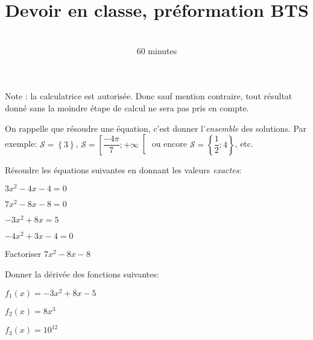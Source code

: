 \documentclass[a4paper,12pt]{scrartcl}
\date{}
\title{Devoir en classe, préformation BTS}
\author{\rotatebox{180}{\textsc{Mathématiques}} \\ 60 minutes}
\begin{document}
\newcommand{\fewlines}{3}
\newcommand{\midlines}{4}
\newcommand{\manylines}{6}

\maketitle


Note : la calculatrice est autorisée. Donc sauf mention contraire, tout résultat donné sans la moindre étape de calcul ne sera pas pris en compte.

On rappelle que résoudre une équation, c'est donner l'\emph{ensemble} des solutions. Par exemple: $\mathcal{S} = \left\lbrace 3 \right\rbrace$, $\mathcal{S} = \left[\dfrac{-4 \pi}{7} ; +\infty \right[$ ou encore $\mathcal{S} = \left\lbrace \dfrac{1}{2} ; 4 \right\rbrace$, etc.


Résoudre les équations suivantes en donnant les valeurs \emph{exactes}:

\question{} $3x^{2} - 4x -4 = 0$

\lignes{\fewlines}

\question{} $7x^{2} -8x -8 = 0$

\lignes{\fewlines}

\question{} $-3x^{2} + 8x = 5$

\lignes{\fewlines}

\question{} $-4x^{2} + 3x - 4 = 0$

\lignes{\fewlines}

\question{} Factoriser $7x^{2} -8x -8$

\lignes{\fewlines}



Donner la dérivée des fonctions suivantes:

\question{} $f_1(x) = -3x^{2} + 8x - 5$

\lignes{\fewlines}

\question{} $f_2(x) = 8x^3$

\lignes{\fewlines}

\question{} $f_3(x) = 10^{12}$

\lignes{\fewlines}



\end{document}
